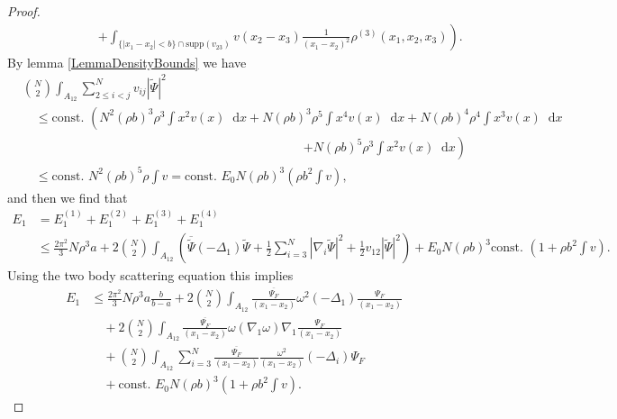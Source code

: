 \documentclass[a4paper,11pt]{article}
\newcommand{\supp}{\text{supp}}
\newcommand{\abs}[1]{\left\lvert #1 \right\rvert}
\newcommand*\diff{\mathop{}\!\mathrm{d}}
\numberwithin{equation}{section}
\begin{document}
\begin{proof}
\begin{equation}
\begin{aligned}
		&\qquad\qquad\qquad\left.+\int_{\{\abs{x_1-x_2}<b\}\cap\supp(v_{23})}v(x_2-x_3)\frac{1}{(x_1-x_2)^2}\rho^{(3)}(x_1,x_2,x_3)\right).
		\end{aligned}
		\end{equation}
		By lemma \ref{LemmaDensityBounds} we have
		\begin{equation}
		\begin{aligned}
		&\binom{N}{2}\int_{A_{12}} \sum_{2\leq i<j}^{N}v_{ij}\abs{\tilde{\Psi}}^2\\&\quad\leq \text{const. } \left(N^2(\rho b)^3\rho^3\int x^2 v(x)\diff x+N(\rho b)^3 \rho^5 \int x^4 v(x)\diff x+N(\rho b)^4\rho^4 \int x^3 v(x)\diff x\right.\\
		&\qquad \qquad \qquad \qquad\hspace{6cm}\left.+N(\rho b)^5 \rho^3 \int x^2 v(x)\diff x\right)\\
		&\quad \leq \text{const. } N^2(\rho b)^5\rho \int v=\text{const. }E_0 N (\rho b)^3 \left(\rho b^2\int v\right),
		\end{aligned}
		\end{equation}
		and then we find that \begin{equation}
		\begin{aligned}
		E_1&=E_1^{(1)}+E_1^{(2)}+E_1^{(3)}+E_1^{(4)}\\&\leq \frac{2\pi^2}{3}N\rho^3 a+2\binom{N}{2}\int_{A_{12}}\left(\overline{\tilde{\Psi}}(-\Delta_1)\tilde{\Psi}+\frac{1}{2}\sum_{i=3}^{N}\abs{\nabla_i\tilde{\Psi}}^2+\frac{1}{2}v_{12}\abs{\tilde{\Psi}}^2\right)+E_0N(\rho b)^3\text{const. }\left(1+\rho b^2 \int v\right).
		\end{aligned}
		\end{equation}
		Using the two body scattering equation this implies \begin{equation}
		\begin{aligned}
		E_1&\leq \frac{2\pi^2}{3}N\rho^3 a\frac{b}{b-a}+2\binom{N}{2}\int_{A_{12}}\frac{\overline{\Psi_F}}{(x_1-x_2)}\omega^2(-\Delta_1)\frac{\Psi_F}{(x_1-x_2)}\\&\quad+2\binom{N}{2}\int_{A_{12}}\frac{\overline{\Psi_F}}{(x_1-x_2)}\omega(\nabla_1\omega)\nabla_1\frac{\Psi_F}{(x_1-x_2)}\\
		&\quad +\binom{N}{2}\int_{A_{12}}\sum_{i=3}^{N} \frac{\overline{\Psi_F}}{(x_1-x_2)}\frac{\omega^2}{(x_1-x_2)}(-\Delta_i)\Psi_F
		\\&\quad+\text{const. }E_0 N (\rho b)^3 \left(1+\rho b^2\int v\right).
		\end{aligned}
		\end{equation}

\end{proof}
\end{document}
